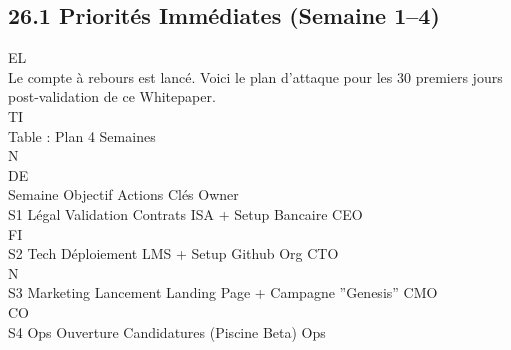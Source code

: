 \documentclass[12pt,landscape,a4paper]{article}
\begin{document}
\subsection{26.1 Priorités Immédiates (Semaine 1–4)}
\vspace{0.5em}
\vspace{0.5em}
\vspace{0.5em}
\vspace{0.5em}
EL\\
Le compte à rebours est lancé. Voici le plan d’attaque pour les 30 premiers jours post-validation de ce Whitepaper.\\
\vspace{0.5em}
\vspace{0.5em}
\vspace{0.5em}
\vspace{0.5em}
TI\\
Table : Plan 4 Semaines\\
\vspace{0.5em}
\vspace{0.5em}
\vspace{0.5em}
\vspace{0.5em}
N\\
DE\\
Semaine Objectif Actions Clés                                 Owner\\
S1      Légal     Validation Contrats ISA + Setup Bancaire    CEO\\
\vspace{0.5em}
\vspace{0.5em}
\vspace{0.5em}
\vspace{0.5em}
FI\\
S2      Tech      Déploiement LMS + Setup Github Org          CTO\\
\vspace{0.5em}
\vspace{0.5em}
N\\
S3      Marketing Lancement Landing Page + Campagne ”Genesis” CMO\\
CO\\
S4      Ops       Ouverture Candidatures (Piscine Beta)       Ops\\
\vspace{0.5em}
\vspace{0.5em}
\vspace{0.5em}
\end{document}
